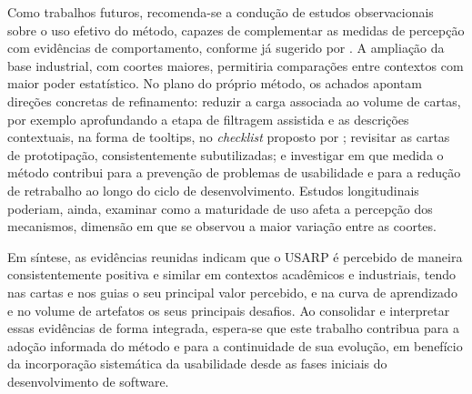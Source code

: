 Como trabalhos futuros, recomenda-se a condução de estudos observacionais sobre o uso efetivo do método, capazes de complementar as medidas de percepção com evidências de comportamento, conforme já sugerido por . A ampliação da base industrial, com coortes maiores, permitiria comparações entre contextos com maior poder estatístico. No plano do próprio método, os achados apontam direções concretas de refinamento: reduzir a carga associada ao volume de cartas, por exemplo aprofundando a etapa de filtragem assistida e as descrições contextuais, na forma de tooltips, no \textit{checklist} proposto por ; revisitar as cartas de prototipação, consistentemente subutilizadas; e investigar em que medida o método contribui para a prevenção de problemas de usabilidade e para a redução de retrabalho ao longo do ciclo de desenvolvimento. Estudos longitudinais poderiam, ainda, examinar como a maturidade de uso afeta a percepção dos mecanismos, dimensão em que se observou a maior variação entre as coortes.

Em síntese, as evidências reunidas indicam que o USARP é percebido de maneira consistentemente positiva e similar em contextos acadêmicos e industriais, tendo nas cartas e nos guias o seu principal valor percebido, e na curva de aprendizado e no volume de artefatos os seus principais desafios. Ao consolidar e interpretar essas evidências de forma integrada, espera-se que este trabalho contribua para a adoção informada do método e para a continuidade de sua evolução, em benefício da incorporação sistemática da usabilidade desde as fases iniciais do desenvolvimento de software.